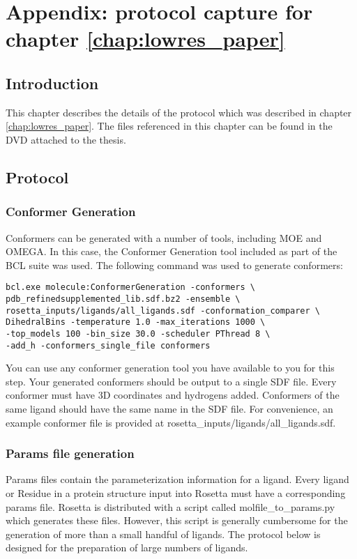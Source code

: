 \chapter{Appendix: protocol capture for chapter \ref{chap:lowres_paper}}
\label{chap:lowres_capture}
\section{Introduction}

This chapter describes the details of the protocol which was described in chapter \ref{chap:lowres_paper}.
The files referenced in this chapter can be found in the DVD attached to the thesis.

\section{Protocol}

\subsection{Conformer Generation}

Conformers can be generated with a number of tools, including MOE and OMEGA.
In this case, the Conformer Generation tool included as part of the \ac{BCL} suite was used.
The following command was used to generate conformers:
\singlespace
\begin{verbatim}
bcl.exe molecule:ConformerGeneration -conformers \
pdb_refinedsupplemented_lib.sdf.bz2 -ensemble \
rosetta_inputs/ligands/all_ligands.sdf -conformation_comparer \
DihedralBins -temperature 1.0 -max_iterations 1000 \
-top_models 100 -bin_size 30.0 -scheduler PThread 8 \
-add_h -conformers_single_file conformers
\end{verbatim}
\doublespace
You can use any conformer generation tool you have available to you for this step.
Your generated conformers should be output to a single \ac{SDF} file.
Every conformer must have 3D coordinates and hydrogens added.
Conformers of the same ligand should have the same name in the \ac{SDF} file.
For convenience, an example conformer file is provided at rosetta\_inputs/ligands/all\_ligands.sdf.

\subsection{Params file generation}

Params files contain the parameterization information for a ligand.
Every  ligand or Residue in a protein structure input into Rosetta must have a corresponding params file.
Rosetta is distributed with a script called molfile\_to\_params.py which generates these files.
However, this script is generally cumbersome for the generation of more than a small handful of ligands.
The protocol below is designed for the preparation of large numbers of ligands.


